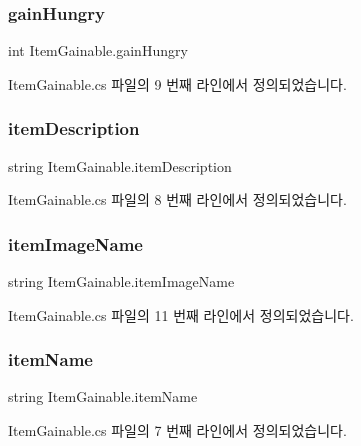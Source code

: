 \subsubsection{\texorpdfstring{gainHungry}{gainHungry}}
{\footnotesize\ttfamily int Item\+Gainable.\+gain\+Hungry}



Item\+Gainable.\+cs 파일의 9 번째 라인에서 정의되었습니다.

\mbox{\label{class_item_gainable_ab02884b73669e6b16be637e13809099e}} 
\subsubsection{\texorpdfstring{itemDescription}{itemDescription}}
{\footnotesize\ttfamily string Item\+Gainable.\+item\+Description}



Item\+Gainable.\+cs 파일의 8 번째 라인에서 정의되었습니다.

\mbox{\label{class_item_gainable_a134053b3639f136a434f1331c15cbc53}} 
\subsubsection{\texorpdfstring{itemImageName}{itemImageName}}
{\footnotesize\ttfamily string Item\+Gainable.\+item\+Image\+Name}



Item\+Gainable.\+cs 파일의 11 번째 라인에서 정의되었습니다.

\mbox{\label{class_item_gainable_a3affbda30d99a3ef6bb2be55ed27784b}} 
\subsubsection{\texorpdfstring{itemName}{itemName}}
{\footnotesize\ttfamily string Item\+Gainable.\+item\+Name}



Item\+Gainable.\+cs 파일의 7 번째 라인에서 정의되었습니다.

